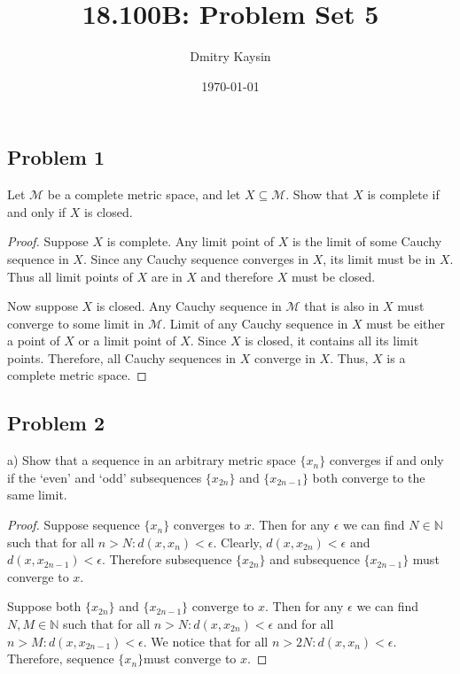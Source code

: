 \documentclass{article}
\title{18.100B: Problem Set 5}
\author{Dmitry Kaysin}
\date\today
\begin{document}
\maketitle 

\subsection*{Problem 1}

\begin{tcolorbox}
Let $\mathcal{M}$ be a complete metric space, and let $X \subseteq \mathcal{M}$. Show that $X$ is complete if and only if $X$ is closed.
\end{tcolorbox}

\begin{proof}
Suppose $X$ is complete. Any limit point of $X$ is the limit of some Cauchy sequence in $X$. Since any Cauchy sequence converges in $X$, its limit must be in $X$. Thus all limit points of $X$ are in $X$ and therefore $X$ must be closed.

Now suppose $X$ is closed. Any Cauchy sequence in $\mathcal{M}$ that is also in $X$ must converge to some limit in $\mathcal{M}$. Limit of any Cauchy sequence in $X$ must be either a point of $X$ or a limit point of $X$. Since $X$ is closed, it contains all its limit points. Therefore, all Cauchy sequences in $X$ converge in $X$. Thus, $X$ is a complete metric space. 
\end{proof}


\subsection*{Problem 2}

\begin{tcolorbox}
a) Show that a sequence in an arbitrary metric space $\{x_n\}$ converges if and only if the ‘even’ and ‘odd’ subsequences $\{x_{2n}\}$ and $\{x_{2n-1}\}$ both converge to the same limit.
\end{tcolorbox}

\begin{proof}
Suppose sequence $\{x_n\}$ converges to $x$. Then for any $\epsilon$ we can find $N \in \mathbb{N}$ such that for all $n > N: d(x, x_n) < \epsilon$. Clearly, $d(x, x_{2n}) < \epsilon$ and $d(x, x_{2n-1}) < \epsilon$. Therefore subsequence $\{x_{2n}\}$ and subsequence $\{x_{2n-1}\}$ must converge to $x$.

Suppose both $\{x_{2n}\}$ and $\{x_{2n-1}\}$ converge to $x$. Then for any $\epsilon$ we can find $N, M \in \mathbb{N}$ such that for all $n > N: d(x, x_{2n}) < \epsilon$ and for all $n > M: d(x, x_{2n-1}) < \epsilon$. We notice that for all $n > 2N: d(x, x_n) < \epsilon$. Therefore, sequence $\{x_n\} $must converge to $x$.
\end{proof}
\end{document}
